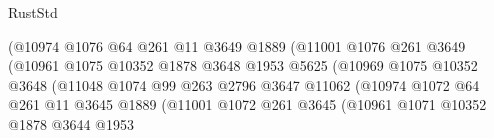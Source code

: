 \begin{lexlean}{RustStd}
\begin{coremodule}
                                          (@10974
                                            @1076
                                            @64
                                            @261
                                            @11
                                            @3649
                                            @1889
                                            (@11001
                                              @1076
                                              @261
                                              @3649
                                              (@10961
                                                @1075
                                                @10352
                                                @1878
                                                @3648
                                                @1953
                                                @5625
                                                (@10969
                                                  @1075
                                                  @10352
                                                  @3648
                                                  (@11048
                                                    @1074
                                                    @99
                                                    @263
                                                    @2796
                                                    @3647
                                                    @11062
                                                    (@10974
                                                      @1072
                                                      @64
                                                      @261
                                                      @11
                                                      @3645
                                                      @1889
                                                      (@11001
                                                        @1072
                                                        @261
                                                        @3645
                                                        (@10961
                                                          @1071
                                                          @10352
                                                          @1878
                                                          @3644
                                                          @1953

\end{coremodule}
\end{lexlean}
